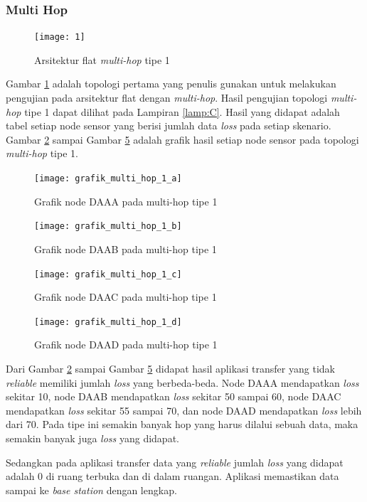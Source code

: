 \subsubsection{Multi Hop}

\begin{figure}[H]
	\centering
	\texttt{[image: 1]}
	\caption{Arsitektur flat \textit{multi-hop} tipe 1}
	\label{fig:1}
\end{figure}
Gambar \ref{fig:1} adalah topologi pertama yang penulis gunakan untuk melakukan pengujian pada arsitektur flat dengan \textit{multi-hop}. Hasil pengujian topologi \textit{multi-hop} tipe 1 dapat dilihat pada Lampiran \ref{lamp:C}. Hasil yang didapat adalah tabel setiap node sensor yang berisi jumlah data \textit{loss} pada setiap skenario. Gambar \ref{fig:grafik_multi_hop_1_a} sampai Gambar \ref{fig:grafik_multi_hop_1_d} adalah grafik hasil setiap node sensor pada topologi \textit{multi-hop} tipe 1.

\begin{figure}[H]
	\centering
	\texttt{[image: grafik\_multi\_hop\_1\_a]}
	\caption{Grafik node DAAA pada multi-hop tipe 1}
	\label{fig:grafik_multi_hop_1_a}
\end{figure}
\begin{figure}[H]
	\centering
	\texttt{[image: grafik\_multi\_hop\_1\_b]}
	\caption{Grafik node DAAB pada multi-hop tipe 1}
	\label{fig:grafik_multi_hop_1_b}
\end{figure}
\begin{figure}[H]
	\centering
	\texttt{[image: grafik\_multi\_hop\_1\_c]}
	\caption{Grafik node DAAC pada multi-hop tipe 1}
	\label{fig:grafik_multi_hop_1_c}
\end{figure}
\begin{figure}[H]
	\centering
	\texttt{[image: grafik\_multi\_hop\_1\_d]}
	\caption{Grafik node DAAD pada multi-hop tipe 1}
	\label{fig:grafik_multi_hop_1_d}
\end{figure}
Dari Gambar \ref{fig:grafik_multi_hop_1_a} sampai Gambar \ref{fig:grafik_multi_hop_1_d} didapat hasil aplikasi transfer yang tidak \textit{reliable} memiliki jumlah \textit{loss} yang berbeda-beda. Node DAAA mendapatkan \textit{loss} sekitar 10, node DAAB mendapatkan \textit{loss} sekitar 50 sampai 60, node DAAC mendapatkan \textit{loss} sekitar 55 sampai 70, dan node DAAD mendapatkan \textit{loss} lebih dari 70. Pada tipe ini semakin banyak hop yang harus dilalui sebuah data, maka semakin banyak juga \textit{loss} yang didapat. 

Sedangkan pada aplikasi transfer data yang \textit{reliable} jumlah \textit{loss} yang didapat adalah 0 di ruang terbuka dan di dalam ruangan. Aplikasi memastikan data sampai ke \textit{base station} dengan lengkap. 

